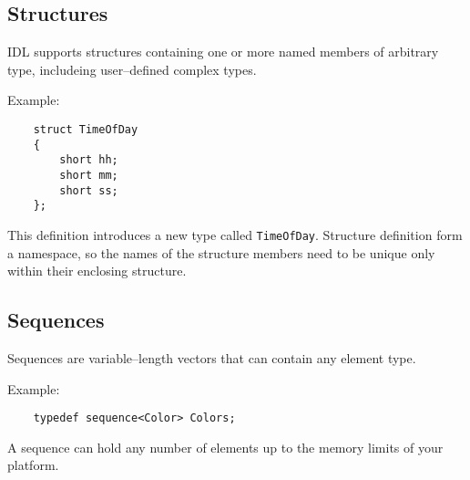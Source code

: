 \subsection{Structures}
IDL supports structures containing one or more named members of arbitrary type,
includeing user--defined complex types.

Example:
\begin{verbatim}
    struct TimeOfDay
    {
        short hh;
        short mm;
        short ss;
    };
\end{verbatim}

This definition introduces a new type called {\tt TimeOfDay}.
Structure definition form a namespace, so the names of the structure members
need to be unique only within their enclosing structure.

\subsection{Sequences}
Sequences are variable--length vectors that can contain any element type. 

Example:
\begin{verbatim}
    typedef sequence<Color> Colors; 
\end{verbatim}

A sequence can hold any number of elements up to the memory limits of your
platform. 

\newpage
